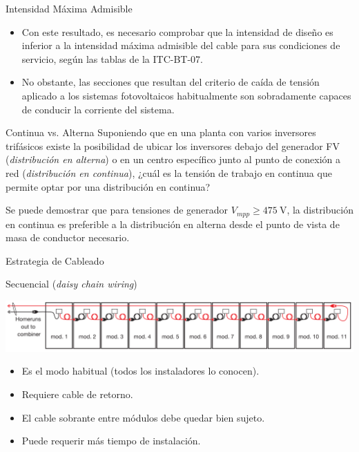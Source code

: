 \documentclass[aspectratio=169, usenames,svgnames,dvipsnames]{beamer}
\begin{document}
\begin{frame}[label={sec:org3bc434b}]{Intensidad Máxima Admisible}
\begin{itemize}
\item Con este resultado, es necesario comprobar que la intensidad de diseño es inferior a la intensidad máxima admisible del cable para sus condiciones de servicio, según las tablas de la ITC-BT-07.

\item No obstante, las secciones que resultan del criterio de caída de tensión aplicado a los sistemas fotovoltaicos habitualmente son sobradamente capaces de conducir la corriente del sistema.
\end{itemize}
\end{frame}

\begin{frame}[label={sec:orgcf33da3}]{Continua vs. Alterna}
Suponiendo que en una planta con varios inversores trifásicos existe la
posibilidad de ubicar los inversores debajo del generador FV
(\emph{distribución en alterna}) o en un centro específico junto al punto de
conexión a red (\emph{distribución en continua}), \alert{¿cuál es la tensión de
trabajo en continua que permite optar por una distribución en continua?}

Se puede demostrar que para tensiones de generador \(V_{mpp} \geq
\qty{475}{\volt}\), la distribución en continua es preferible a la
distribución en alterna desde el punto de vista de masa de conductor
necesario.
\end{frame}


\begin{frame}[label={sec:org034d017}]{Estrategia de Cableado}
\begin{block}{Secuencial (\emph{daisy chain wiring})}
\begin{center}
\includegraphics[width=\textwidth]{../figs/DaisyChainWiring.png}
\end{center}

\begin{itemize}
\item Es el modo habitual (todos los instaladores lo conocen).
\item Requiere cable de retorno.
\item El cable sobrante entre módulos debe quedar bien sujeto.
\item Puede requerir más tiempo de instalación.
\end{itemize}
\end{block}
\end{frame}
\end{document}

